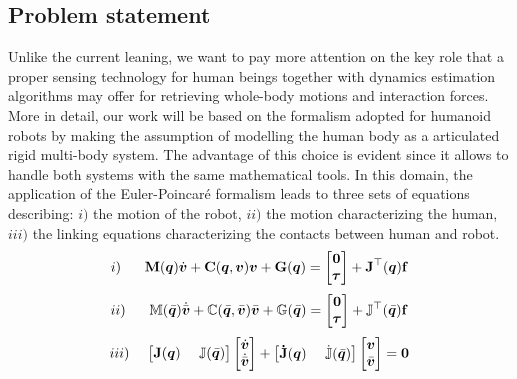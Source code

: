 \subsection{Problem statement}
Unlike the current leaning, we want to pay more attention on the key role that 
a proper sensing technology for human beings together with dynamics estimation algorithms
  may offer for retrieving whole-body motions and interaction forces. 
 More in detail, our work will be based on the formalism adopted for humanoid robots by 
 making the assumption of modelling the human body as a articulated rigid multi-body system. 
The advantage of this choice is evident since it allows to handle both systems
with the same mathematical tools. In this domain, the application of the Euler-Poincar\'{e} 
formalism \cite{Marsden2010} leads to three sets of equations describing:
    $i)$ the motion of the robot,
	$ii)$ the motion characterizing the human,
	$iii)$ the linking equations characterizing the contacts between human and robot. 
%
\begin{eqnarray*}
\label{robot}
i) \hspace{0.6cm} 
\bm {\mathrm{M}}(\bm {{q}}) \dot{\bm{v}} + \bm {\mathrm{C}}(\bm {{q}},
 \bm{v})
\bm{v} + \bm {\mathrm{G}}(\bm {{q}}) = \begin{bmatrix} \bm 0 \\ {\bm \tau}
 \end{bmatrix} + \bm {\mathrm{J}}^\top(\bm {{q}}) \bm{\mathrm{f}}
\end{eqnarray*}
%
\begin{eqnarray*}
\label{human}
ii) \hspace{0.6cm}
\mathbb{M}(\bar{\bm q}) \dot{\bar{\bm v}} + \mathbb{C}(\bar{\bm q}, \bar{\bm v})
\bar{\bm v} + \mathbb{G}(\bar{\bm q}) = \begin{bmatrix} \bm 0 \\ {\bm \tau} \end{bmatrix}
+ \mathbb{J}^\top(\bar{\bm q}) \bm{\mathrm{f}}
\end{eqnarray*}
%
\begin{eqnarray*}
\label{linking}
iii) \hspace{0.4cm}
\begin{bmatrix} \bm {\mathrm{J}}(\bm {{q}}) & ~\mathbb{J}(\bar{\bm q}) \end{bmatrix}
	\begin{bmatrix} \dot{\bm{v}} \\ \dot{\bar{\bm v}} \end{bmatrix} +
		\begin{bmatrix} \bm {\dot{\mathrm{J}}}(\bm {{q}}) & 
			~\dot{\mathbb{J}}(\bar{\bm q})
		 \end{bmatrix}
			\begin{bmatrix}{\bm{v}} \\ {\bar{\bm v}} \end{bmatrix} = \bm 0
\end{eqnarray*}
